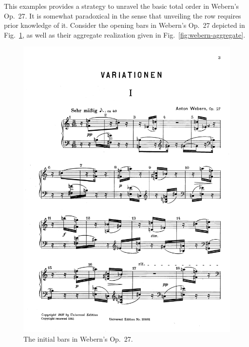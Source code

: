 \begin{example}
	\cite[207]{Starr1984}
	\label{starr-webern-example}
	This examples provides a strategy to unravel the basic total order in Webern's Op.~27. It is somewhat paradoxical in the sense that unveiling the row requires prior knowledge of it. Consider the opening bars in Webern's Op.~27 depicted in Fig.~\ref{fig:webern-27}, as well as their aggregate realization given in Fig.~\ref{fig:webern-aggregate}.

    \begin{figure}[htbp]
    	\centering
		\includegraphics[width=6.5in]{figures/webern1.pdf}
		\caption[Bars 1--7 in Webern's Op.~27]{The initial bars in Webern's Op.~27.}
    	\label{fig:webern-27}
	\end{figure}


\end{example}
